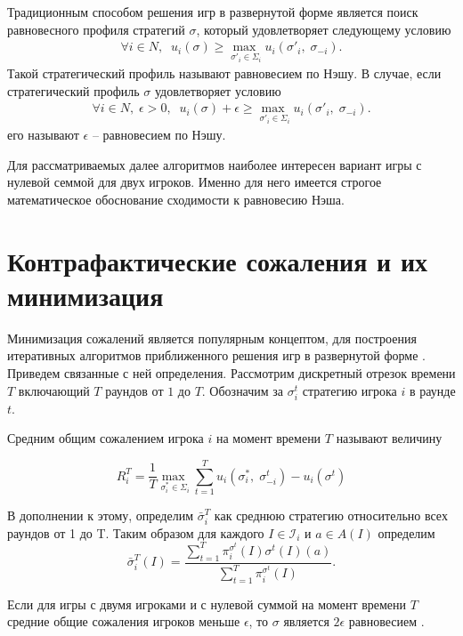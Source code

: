 Традиционным способом решения игр в развернутой форме является поиск равновесного профиля стратегий $\sigma$, который удовлетворяет следующему условию 
\begin{equation}
\begin{split}
	\forall i \in N,\;\;u_i(\sigma)\geq \underset{\sigma'_i\in \Sigma_i}{\max\;} u_i(\sigma'_i,\;\sigma_{-i}).
\end{split}
\end{equation} 
Такой стратегический профиль называют равновесием по Нэшу. В случае, если стратегический профиль $\sigma$ удовлетворяет условию 
\begin{equation}
	\begin{split}
		\forall i \in N,\; \epsilon > 0, \;\;u_i(\sigma) + \epsilon \geq \underset{\sigma'_i\in \Sigma_i}{\max\;} u_i(\sigma'_i,\;\sigma_{-i}).
	\end{split}
\end{equation}
его называют $\epsilon$ – равновесием по Нэшу.
\par
Для рассматриваемых далее алгоритмов наиболее интересен вариант игры с нулевой семмой для двух игроков. Именно для него имеется строгое математическое обоснование сходимости к равновесию Нэша.

\section{Контрафактические сожаления и их минимизация}

Минимизация сожалений является популярным концептом, для построения итеративных алгоритмов приближенного решения игр в развернутой форме \cite{RegretMatching}. Приведем связанные с ней определения. Рассмотрим дискретный отрезок времени $T$ включающий $T$ раундов от $1$ до $T$. Обозначим за $\sigma_i^t$ стратегию игрока $i$ в раунде $t$. 
\begin{defin}
	Средним общим сожалением игрока $i$ на момент времени $T$ называют величину 
\end{defin}
\begin{equation}
	R_i^T=\frac{1}{T} \underset{\sigma_i^*\in \Sigma_i}{\max\;}\sum_{t=1}^{T}u_i(\sigma_i^* ,\;\sigma_{-i}^t)-u_i(\sigma^t)
\end{equation} 

В дополнении к этому, определим $\bar{\sigma}_i^T$ как среднюю стратегию относительно всех раундов от 1 до T. Таким образом для каждого $I \in \mathcal{I}_i$ и $a\in A(I)$ определим 
\begin{equation}
	\bar{\sigma}_i^T(I)=\frac{\sum^T_{t=1}\pi_i^{\sigma^t}(I)\sigma^t(I)(a)}{\sum_{t=1}^{T}\pi_i^{\sigma^t}(I)}.
\end{equation}
\begin{theo} Если для игры с двумя игроками и с нулевой суммой на момент времени $T$ средние общие сожаления игроков меньше $\epsilon$, то $\sigma$ является $2\epsilon$ равновесием \cite{NIPS07cfr}. 
\end{theo}

